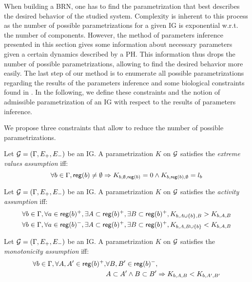 When building a BRN, one has to find the parametrization that best describes the desired behavior of the studied system. Complexity is inherent to this process as the number of possible parametrizations for a given IG is exponential w.r.t. the number of components. However, the method of parameters inference presented in this section gives some information about necessary parameters given a certain dynamics described by a PH. This information thus drops the number of possible parametrizations, allowing to find the desired behavior more easily. The last step of our method is to enumerate all possible parametrizations regarding the results of the parameters inference and some biological constraints found in \cite{BernotSemBRN}. In the following, we define these constraints and the notion of admissible parametrization of an IG with respect to the results of parameters inference.

We propose three constraints that allow to reduce the number of possible parametrizations.

\begin{property}
Let $\mathcal{G} = (\Gamma, E_+, E_-)$ be an IG. A parametrization $K$ on $\mathcal{G}$ satisfies the \emph{extreme values assumption} iff:
\label{prop:param_enum_extreme}
\[
  \forall b \in \Gamma, \mathsf{reg}({b}) \neq \emptyset \Rightarrow K_{b,\emptyset,\mathsf{reg}({b})} = 0 \wedge K_{b,\mathsf{reg}({b}),\emptyset} = l_b
\]
\end{property}

\begin{property}
\label{prop:param_enum_activity}
Let $\mathcal{G} = (\Gamma, E_+, E_-)$ be an IG. A parametrization $K$ on $\mathcal{G}$ satisfies the \emph{activity assumption} iff:
\begin{align*}
  \forall b \in \Gamma, \forall a \in \mathsf{reg}({b})^+, \exists A \subset \mathsf{reg}({b})^+, \exists B \subset \mathsf{reg}({b})^+,
    K_{b,A \cup \{b\},B} > K_{b,A,B}
\\
  \forall b \in \Gamma, \forall a \in \mathsf{reg}({b})^-, \exists A \subset \mathsf{reg}({b})^+, \exists B \subset \mathsf{reg}({b})^+,
    K_{b,A,B \cup \{b\}} < K_{b,A,B}
\end{align*}
\end{property}

\begin{property}
\label{prop:param_enum_monotonicity}
Let $\mathcal{G} = (\Gamma, E_+, E_-)$ be an IG. A parametrization $K$ on $\mathcal{G}$ satisfies the \emph{monotonicity assumption} iff:
\begin{align*}
  \forall b \in \Gamma, \forall A, A' \in \mathsf{reg}({b})^+, &\forall B, B' \in \mathsf{reg}({b})^-,
\\
  &A \subset A' \wedge B \subset B' \Rightarrow K_{b,A,B} < K_{b,A',B'}
\end{align*}
\end{property}

